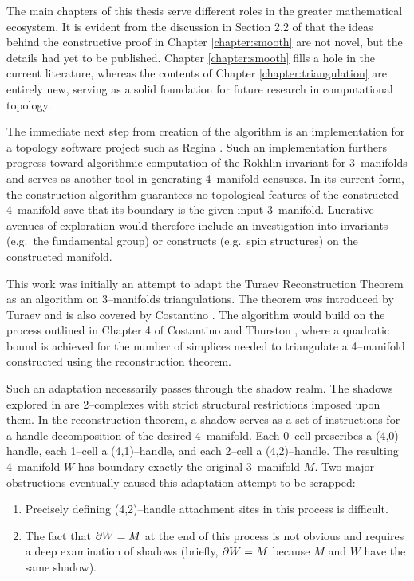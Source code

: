 \label{chapter:conclusion}

The main chapters of this thesis serve different roles in the greater mathematical ecosystem.
It is evident from the discussion in Section 2.2 of \cite{CostThur08} that the ideas behind the constructive proof in Chapter \ref{chapter:smooth} are not novel, but the details had yet to be published.
Chapter \ref{chapter:smooth} fills a hole in the current literature, whereas the contents of Chapter \ref{chapter:triangulation} are entirely new, serving as a solid foundation for future research in computational topology.

The immediate next step from creation of the algorithm is an implementation for a topology software project such as Regina \cite{regina}.
Such an implementation furthers progress toward algorithmic computation of the Rokhlin invariant for 3--manifolds and serves as another tool in generating 4--manifold censuses.
In its current form, the construction algorithm guarantees no topological features of the constructed 4--manifold save that its boundary is the given input 3--manifold.
Lucrative avenues of exploration would therefore include an investigation into invariants (e.g.\ the fundamental group) or constructs (e.g.\ spin structures) on the constructed manifold.

This work was initially an attempt to adapt the Turaev Reconstruction Theorem as an algorithm on 3--manifolds triangulations.
The theorem was introduced by Turaev \cite{Turaev91} and is also covered by Costantino \cite{Cost05}.
The algorithm would build on the process outlined in Chapter 4 of Costantino and Thurston \cite{CostThur08}, where a quadratic bound is achieved for the number of simplices needed to triangulate a 4--manifold constructed using the reconstruction theorem.

Such an adaptation necessarily passes through the shadow realm.
The shadows explored in \cite{Turaev91} are 2--complexes with strict structural restrictions imposed upon them.
In the reconstruction theorem, a shadow serves as a set of instructions for a handle decomposition of the desired 4--manifold.
Each 0--cell prescribes a (4,0)--handle, each 1--cell a (4,1)--handle, and each 2--cell a (4,2)--handle.
The resulting 4--manifold $W$ has boundary exactly the original 3--manifold $M$.
Two major obstructions eventually caused this adaptation attempt to be scrapped:
\begin{enumerate}
	\item Precisely defining (4,2)--handle attachment sites in this process is difficult.
	\item The fact that $\partial W = M$ at the end of this process is not obvious and requires a deep examination of shadows (briefly, $\partial W = M$ because $M$ and $W$ have the same shadow).
\end{enumerate}

